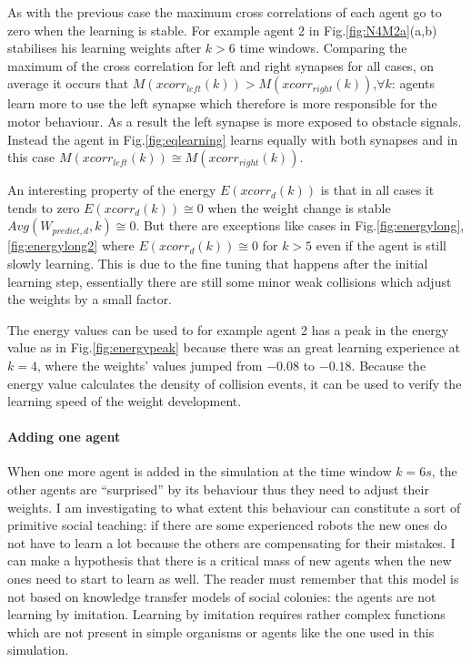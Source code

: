 As with the previous case the maximum cross correlations of each agent go
to zero when the learning is stable.
For example agent 2 in Fig.\ref{fig:N4M2a}(a,b) stabilises his learning weights
after $k>6$ time windows.
Comparing the maximum of the cross correlation for left and right synapses for all cases,
on average it occurs that $M(xcorr_{left}(k))>M(xcorr_{right}(k))$,$\forall k$:
agents learn more to use the left synapse which therefore is more responsible for the motor
behaviour. As a result the left synapse is more exposed to obstacle signals.
Instead the agent in Fig.\ref{fig:eqlearning} learns equally with both synapses
and in this case $M(xcorr_{left}(k))\cong M(xcorr_{right}(k))$.

An interesting property of the energy $E(xcorr_{d}(k))$ is that in all cases it tends
to zero $E(xcorr_{d}(k)) \cong 0$ when the weight change is stable $Avg(W_{predict,d},k) \cong 0$.
But there are exceptions like cases in Fig.\ref{fig:energylong},\ref{fig:energylong2}
where $E(xcorr_{d}(k)) \cong 0$ for $k>5$ even if the agent is still slowly learning.
This is due to the fine tuning that happens after the initial learning step, essentially
there are still some minor weak collisions which adjust the weights by a small factor.

The energy values can be used to for example agent 2 has a peak in the energy value
as in Fig.\ref{fig:energypeak} because there was an great learning experience at $k=4$,
where the weights' values jumped from $-0.08$ to $-0.18$.
Because the energy value calculates the density of collision events, it can be used
to verify the learning speed of the weight development.

\paragraph{Adding one agent}
When one more agent is added in the simulation at the time window $k=6 s$,
the other agents are ``surprised'' by its behaviour thus they need to adjust their weights.
I am investigating to what extent this behaviour can constitute a sort of primitive social teaching:
if there are some experienced robots the new ones do not have to learn a lot because the others are
compensating for their mistakes.
I can make a hypothesis that there is a critical mass of new agents
when the new ones need to start to learn as well.
The reader must remember that this model is not based on knowledge transfer models of
social colonies: the agents are not learning by imitation.
Learning by imitation requires rather complex functions which are not present in
simple organisms or agents like the one used in this simulation.


